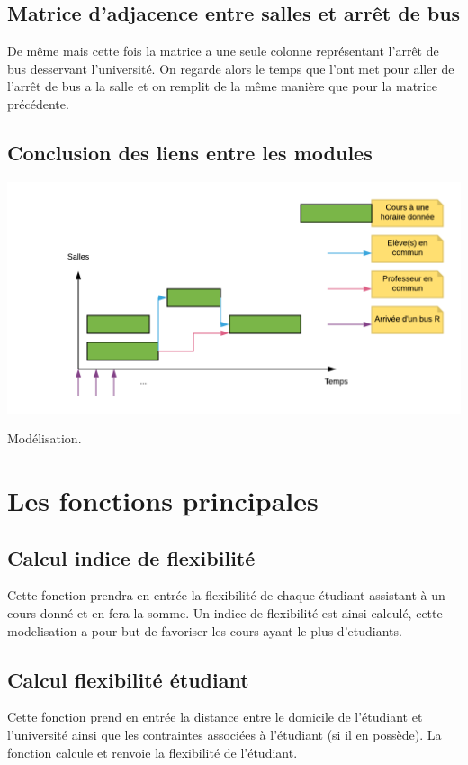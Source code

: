 \documentclass[a4paper,11pt]{article}
\begin{document}
	\subsection{Matrice d'adjacence entre salles et arrêt de bus}
		De même mais cette fois la matrice a une seule colonne représentant l'arrêt de bus desservant l'université.
		On regarde alors le temps que l'ont met pour aller de l'arrêt de bus a la salle et on remplit de la même manière que pour la matrice précédente.
	\subsection{Conclusion des liens entre les modules}
		\centerline{\includegraphics[scale=0.5]{modelter.png}}
		Modélisation.\\
	

\section{Les fonctions principales}
	\subsection{Calcul indice de flexibilité}
		Cette fonction prendra en entrée la flexibilité de chaque étudiant assistant à un cours donné et en fera la somme. 
		Un indice de flexibilité est ainsi calculé, cette modelisation a pour but de favoriser les cours ayant le plus d'etudiants.\\
		
	\subsection{Calcul flexibilité étudiant}
		Cette fonction prend en entrée la distance entre le domicile de l'étudiant et l'université ainsi que les contraintes
		associées à l'étudiant (si il en possède). La fonction calcule et renvoie la flexibilité de l'étudiant.
\end{document}

